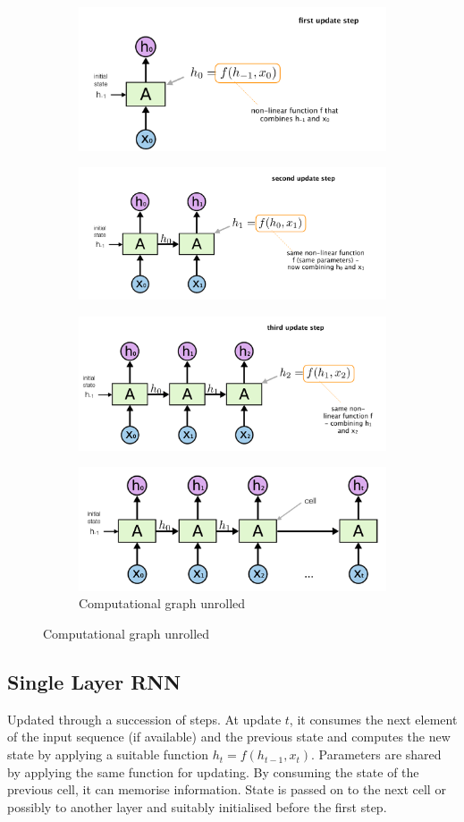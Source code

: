 \documentclass[11pt]{article}
\begin{document}
\begin{figure}[htb]
	\begin{subfigure}{\linewidth}
		\centering
		\includegraphics[width=0.6\linewidth]{recurrent_cell}
		\end{subfigure}
	\begin{subfigure}{\linewidth}
		\centering
		\includegraphics[width=0.6\linewidth]{recurrent_cells}
	\end{subfigure}
	\begin{subfigure}{\linewidth}
		\centering
		\includegraphics[width=0.6\linewidth]{recurrent_cells2}
	\end{subfigure}
	\begin{subfigure}{\linewidth}
		\centering
		\includegraphics[width=0.6\linewidth]{recurrent_cells_graph}
		\caption{Computational graph unrolled}
	\end{subfigure}
\end{figure}

\subsection{Single Layer RNN}
Updated through a succession of steps. At update $t$, it consumes the next element of the input sequence (if available) and the previous state and computes the new state by applying a suitable function $h_t = f(h_{t-1}, x_t)$. Parameters are shared by applying the same function for updating. By consuming the state of the previous cell, it can memorise information. State is passed on to the next cell or possibly to another layer and suitably initialised before the first step.
\end{document}
